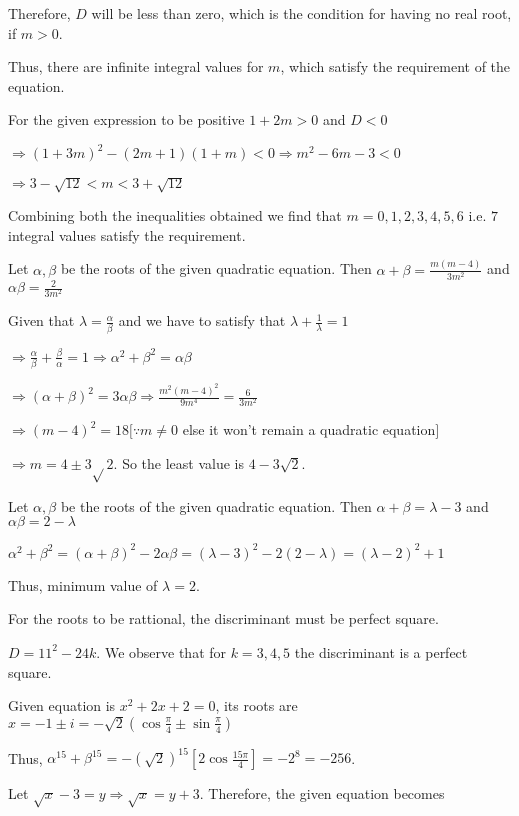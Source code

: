   Therefore, $D$ will be less than zero, which is the condition for having no real root, if $m > 0$.

  Thus, there are infinite integral values for $m$, which satisfy the requirement of the equation.
\item For the given expression to be positive $1 + 2m > 0$ and $D < 0$

  $\Rightarrow (1 + 3m)^2 - (2m + 1)(1 + m) < 0 \Rightarrow m^2 - 6m - 3 < 0$

  $\Rightarrow 3 - \sqrt{12} < m < 3 + \sqrt{12}$

  Combining both the inequalities obtained we find that $m = 0, 1, 2, 3, 4, 5, 6$ i.e. $7$ integral values
  satisfy the requirement.
\item Let $\alpha, \beta$ be the roots of the given quadratic equation. Then $\alpha + \beta = \frac{m(m -
  4)}{3m^2}$ and $\alpha\beta = \frac{2}{3m^2}$

  Given that $\lambda = \frac{\alpha}{\beta}$ and we have to satisfy that $\lambda + \frac{1}{\lambda} = 1$

  $\Rightarrow \frac{\alpha}{\beta} + \frac{\beta}{\alpha} = 1\Rightarrow \alpha^2 + \beta^2 = \alpha\beta$

  $\Rightarrow (\alpha + \beta)^2 = 3\alpha\beta \Rightarrow \frac{m^2(m - 4)^2}{9m^4} = \frac{6}{3m^2}$

  $\Rightarrow (m - 4)^2 = 18[\because m\neq 0$ else it won't remain a quadratic equation$]$

  $\Rightarrow m = 4\pm3\sqrt{}2$.  So the least value is $4 - 3\sqrt{2}$.
\item Let $\alpha, \beta$ be the roots of the given quadratic equation. Then $\alpha +\beta = \lambda - 3$
  and $\alpha\beta = 2 - \lambda$

  $\alpha^2 + \beta^2 = (\alpha + \beta)^2 - 2\alpha\beta = (\lambda - 3)^2 - 2(2 - \lambda) = (\lambda -
  2)^2 + 1$

  Thus, minimum value of $\lambda = 2$.
\item For the roots to be rattional, the discriminant must be perfect square.

  $D = 11^2 - 24k$. We observe that for $k = 3, 4, 5$ the discriminant is a perfect square.
\item Given equation is $x^2 + 2x + 2 = 0$, its roots are $x = -1\pm i = -\sqrt{2}\left(\cos\frac{\pi}{4}
  \pm\sin \frac{\pi}{4}\right)$

  Thus, $\alpha^{15} + \beta^{15} = -\left(\sqrt{2}\right)^{15}\left[2\cos\frac{15\pi}{4}\right] = -2^8 =
  -256$.
\item Let $\sqrt{x} - 3 = y \Rightarrow \sqrt{x} = y + 3$. Therefore, the given equation becomes

